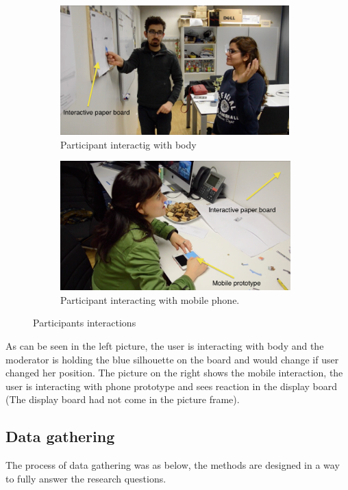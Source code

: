 \begin{figure}[H]
    \centering
    \begin{subfigure}[H]{0.48\textwidth}
        \centering
        \includegraphics[width=\textwidth,height=5cm]{Figures/5/body}
        \caption{Participant interactig with body}
        \label{fig:screen_proto_inter}
    \end{subfigure}
    \begin{subfigure}[H]{0.48\textwidth}
        \centering
        \includegraphics[width=\textwidth,height=5cm]{Figures/5/mobile}
        \caption{Participant interacting with mobile phone.}
        \label{fig:mobileproto_inter}
    \end{subfigure}
    \caption{Participants interactions}
    \label{fig:paper_prototype_screen}
\end{figure}

As can be seen in the left picture, the user is interacting with body and the moderator is holding the blue silhouette on the board and would change if user changed her position. The picture on the right shows the mobile interaction, the user is interacting with phone prototype and sees reaction in the display board (The display board had not come in the picture frame).

\subsection{Data gathering}
The process of data gathering was as below, the methods are designed in a way to fully answer the research questions.


